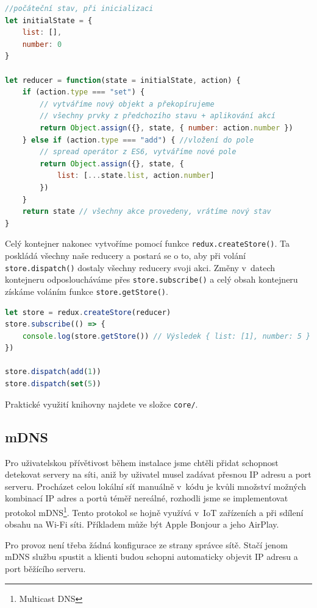 \documentclass[a4paper,11pt,oneside]{article}
\begin{document}
\pagebreak


\begin{lstlisting}[language=javascript, caption={JavaScript}]
//počáteční stav, při inicializaci
let initialState = {
	list: [],
	number: 0
} 

let reducer = function(state = initialState, action) {
	if (action.type === "set") {
		// vytváříme nový objekt a překopírujeme 
		// všechny prvky z předchozího stavu + aplikování akcí
		return Object.assign({}, state, { number: action.number })
	} else if (action.type === "add") { //vložení do pole 
		// spread operátor z ES6, vytváříme nové pole
		return Object.assign({}, state, { 
			list: [...state.list, action.number] 
		})
	} 
	return state // všechny akce provedeny, vrátíme nový stav
}
\end{lstlisting}

Celý kontejner nakonec vytvoříme pomocí funkce \lstinline|redux.createStore()|. Ta poskládá všechny naše reducery a postará se o to, aby při volání \lstinline|store.dispatch()| dostaly všechny reducery svoji akci. Změny v~datech kontejneru odposloucháváme přes \lstinline|store.subscribe()| a celý obsah kontejneru získáme voláním funkce \lstinline|store.getStore()|.

\begin{lstlisting}[language=javascript, caption={JavaScript}]
let store = redux.createStore(reducer)
store.subscribe(() => {
	console.log(store.getStore()) // Výsledek { list: [1], number: 5 }
})

store.dispatch(add(1))
store.dispatch(set(5))
\end{lstlisting}

Praktické využití knihovny najdete ve složce \lstinline|core/|.

\subsection{mDNS}

Pro uživatelskou přívětivost během instalace jsme chtěli přidat schopnost detekovat servery na síti, aniž by uživatel musel zadávat přesnou IP adresu a port serveru. Procházet celou lokální síť manuálně v~kódu je kvůli množství možných kombinací IP adres a portů téměř nereálné, rozhodli jsme se implementovat protokol mDNS\footnote{Multicast DNS}. Tento protokol se hojně využívá v~IoT zařízeních a při sdílení obsahu na Wi-Fi síti. Příkladem může být Apple Bonjour a jeho AirPlay.

Pro provoz není třeba žádná konfigurace ze strany správce sítě. Stačí jenom mDNS službu spustit a klienti budou schopni automaticky objevit IP adresu a port běžícího serveru. 
\end{document}
